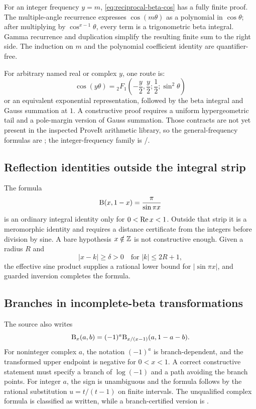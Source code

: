 For an integer frequency $y=m$, \eqref{eq:reciprocal-beta-cos} has a fully finite proof.  The multiple-angle recurrence expresses $\cos(m\theta)$ as a polynomial in $\cos\theta$; after multiplying by $\cos^{x-1}\theta$, every term is a trigonometric beta integral.  Gamma recurrence and duplication simplify the resulting finite sum to the right side.  The induction on $m$ and the polynomial coefficient identity are quantifier-free.

For arbitrary named real or complex $y$, one route is:
\[
 \cos(y\theta)=
 {}_2F_1\!\left(-\frac y2,\frac y2;\frac12;\sin^2\theta\right)
\]
or an equivalent exponential representation, followed by the beta integral and Gauss summation at $1$.  A constructive proof requires a uniform hypergeometric tail and a pole-margin version of Gauss summation.  Those contracts are not yet present in the inspected ProveIt arithmetic library, so the general-frequency formulas are \statusC{}; the integer-frequency family is \statusA/\statusB{}.

\subsection{Reflection identities outside the integral strip}

The formula
\[
 \mathrm B(x,1-x)=\frac{\pi}{\sin\pi x}
\]
is an ordinary integral identity only for $0<\operatorname{Re} x<1$.  Outside that strip it is a meromorphic identity and requires a distance certificate from the integers before division by sine.  A bare hypothesis $x\notin\mathbb Z$ is not constructive enough.  Given a radius $R$ and
\[
 |x-k|\ge\delta>0
 \quad\text{for }|k|\le2R+1,
\]
the effective sine product supplies a rational lower bound for
$|\sin\pi x|$, and guarded inversion completes the formula.

\subsection{Branches in incomplete-beta transformations}

The source also writes
\[
 \mathrm B_x(a,b)=(-1)^a
 \mathrm B_{x/(x-1)}(a,1-a-b).
\]
For noninteger complex $a$, the notation $(-1)^a$ is branch-dependent, and the transformed upper endpoint is negative for $0<x<1$.  A correct constructive statement must specify a branch of $\log(-1)$ and a path avoiding the branch points.  For integer $a$, the sign is unambiguous and the formula follows by the rational substitution $u=t/(t-1)$ on finite intervals.  The unqualified complex formula is classified \statusD{} as written, while a branch-certified version is \statusC{}.

